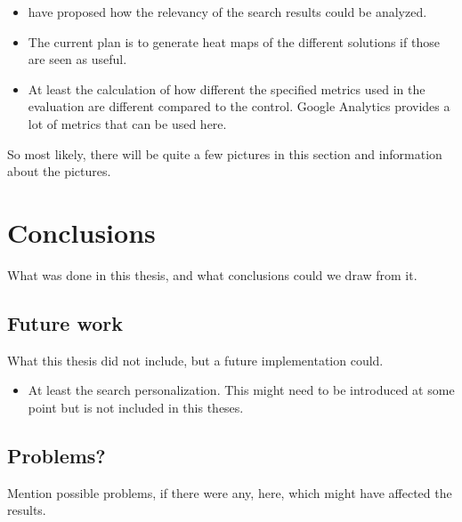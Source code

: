 \begin{itemize}
    \item \citeauthor{relevantSearch} \cite{relevantSearch} have proposed how the relevancy of the search results could be analyzed. 
    
    \item The current plan is to generate heat maps of the different solutions if those are seen as useful.

    \item At least the calculation of how different the specified metrics used in the evaluation are different compared to the control.
    Google Analytics provides a lot of metrics that can be used here.     
\end{itemize}

So most likely, there will be quite a few pictures in this section and information about the pictures. \cite{analyticsAbout}


\chapter{Conclusions}
What was done in this thesis, and what conclusions could we draw from it.



\section{Future work}
What this thesis did not include, but a future implementation could.

\begin{itemize}
    \item At least the search personalization. 
    This might need to be introduced at some point but is not included in this theses.
\end{itemize}



\section{Problems?}
Mention possible problems, if there were any, here, which might have affected the results.


